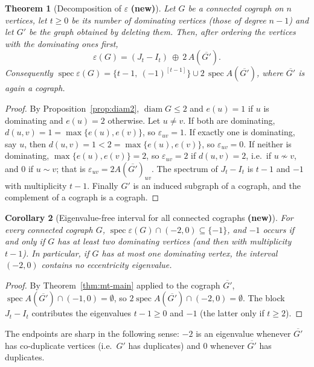 \documentclass[11pt]{article}
\theoremstyle{plain}
\newtheorem{theorem}{Theorem}[section]
\newtheorem{corollary}[theorem]{Corollary}
\theoremstyle{definition}
\theoremstyle{remark}
\DeclareMathOperator{\spec}{spec}
\DeclareMathOperator{\diam}{diam}
\begin{document}
	\begin{theorem}[Decomposition of $\varepsilon$ \textbf{(new)}]
		\label{thm:eccdecomp}
		Let $G$ be a connected cograph on $n$ vertices, let $t\ge0$ be its number of dominating vertices (those of degree $n-1$) and let $G'$ be the graph obtained by deleting them. Then, after ordering the vertices with the dominating ones first,
		\[
		\varepsilon(G)=(J_t-I_t)\ \oplus\ 2\,A(\overline{G'}).
		\]
		Consequently $\spec\varepsilon(G)=\{t-1,\ (-1)^{[t-1]}\}\cup2\,\spec A(\overline{G'})$, where $\overline{G'}$ is again a cograph.
	\end{theorem}
	\begin{proof}
		By Proposition~\ref{prop:diam2}, $\diam G\le2$ and $e(u)=1$ if $u$ is dominating and $e(u)=2$ otherwise. Let $u\ne v$. If both are dominating, $d(u,v)=1=\max\{e(u),e(v)\}$, so $\varepsilon_{uv}=1$. If exactly one is dominating, say $u$, then $d(u,v)=1<2=\max\{e(u),e(v)\}$, so $\varepsilon_{uv}=0$. If neither is dominating, $\max\{e(u),e(v)\}=2$, so $\varepsilon_{uv}=2$ if $d(u,v)=2$, i.e.\ if $u\not\sim v$, and $0$ if $u\sim v$; that is $\varepsilon_{uv}=2A(\overline{G'})_{uv}$. The spectrum of $J_t-I_t$ is $t-1$ and $-1$ with multiplicity $t-1$. Finally $G'$ is an induced subgraph of a cograph, and the complement of a cograph is a cograph. \qedhere
	\end{proof}
	
	\begin{corollary}[Eigenvalue-free interval for all connected cographs \textbf{(new)}]
		\label{cor:eccfree}
		For every connected cograph $G$, $\spec\varepsilon(G)\cap(-2,0)\subseteq\{-1\}$, and $-1$ occurs if and only if $G$ has at least two dominating vertices (and then with multiplicity $t-1$). In particular, if $G$ has at most one dominating vertex, the interval $(-2,0)$ contains no eccentricity eigenvalue.
	\end{corollary}
	\begin{proof}
		By Theorem~\ref{thm:mt-main} applied to the cograph $\overline{G'}$, $\spec A(\overline{G'})\cap(-1,0)=\emptyset$, so $2\spec A(\overline{G'})\cap(-2,0)=\emptyset$. The block $J_t-I_t$ contributes the eigenvalues $t-1\ge0$ and $-1$ (the latter only if $t\ge2$). \qedhere
	\end{proof}
	
	The endpoints are sharp in the following sense: $-2$ is an eigenvalue whenever $\overline{G'}$ has co-duplicate vertices (i.e.\ $G'$ has duplicates) and $0$ whenever $\overline{G'}$ has duplicates. 
	
\end{document}
